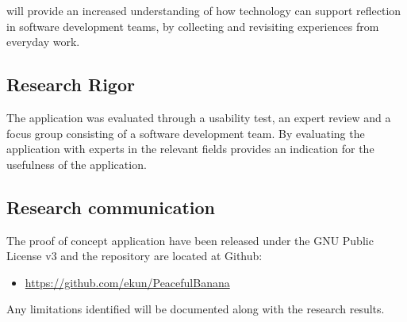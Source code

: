  will provide an increased understanding of how technology can support reflection in software development teams, by collecting and revisiting experiences from everyday work. 

\subsection{Research Rigor}
The application was evaluated through a usability test, an expert review and a focus group consisting of a software development team. By evaluating the application with experts in the relevant fields provides an indication for the usefulness of the application.

\subsection{Research communication}
The proof of concept application have been released under the GNU Public License v3 and the repository are located at Github: 
\begin{itemize}
	\item \url{https://github.com/ekun/PeacefulBanana}
\end{itemize} 
Any limitations identified  will be documented along with the research results. 



